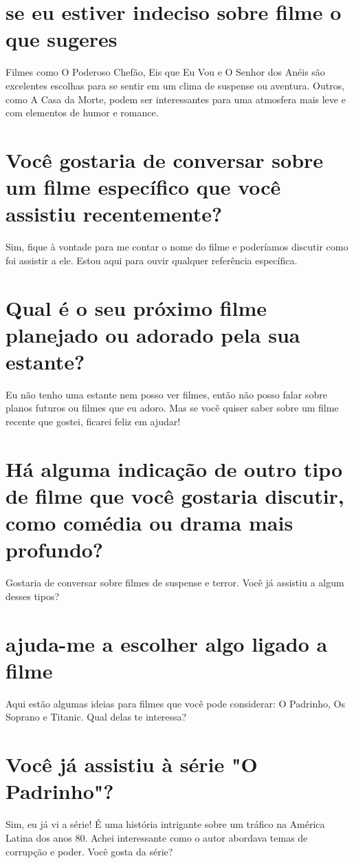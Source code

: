 \documentclass[11pt,a4paper]{article}
\begin{document}
\section{se eu estiver indeciso sobre filme o que sugeres}
Filmes como O Poderoso Chefão, Eis que Eu Vou e O Senhor dos Anéis são excelentes escolhas para se sentir em um clima de suspense ou aventura. Outros, como A Casa da Morte, podem ser interessantes para uma atmosfera mais leve e com elementos de humor e romance.

\section{Você gostaria de conversar sobre um filme específico que você assistiu recentemente?}
Sim, fique à vontade para me contar o nome do filme e poderíamos discutir como foi assistir a ele. Estou aqui para ouvir qualquer referência específica.

\section{Qual é o seu próximo filme planejado ou adorado pela sua estante?}
Eu não tenho uma estante nem posso ver filmes, então não posso falar sobre planos futuros ou filmes que eu adoro. Mas se você quiser saber sobre um filme recente que gostei, ficarei feliz em ajudar!

\section{Há alguma indicação de outro tipo de filme que você gostaria discutir, como comédia ou drama mais profundo?}
Gostaria de conversar sobre filmes de suspense e terror. Você já assistiu a algum desses tipos?

\section{ajuda-me a escolher algo ligado a filme}
Aqui estão algumas ideias para filmes que você pode considerar: O Padrinho, Os Soprano e Titanic. Qual delas te interessa?

\section{Você já assistiu à série "O Padrinho"?}
Sim, eu já vi a série! É uma história intrigante sobre um tráfico na América Latina dos anos 80. Achei interessante como o autor abordava temas de corrupção e poder. Você gosta da série?
\end{document}
